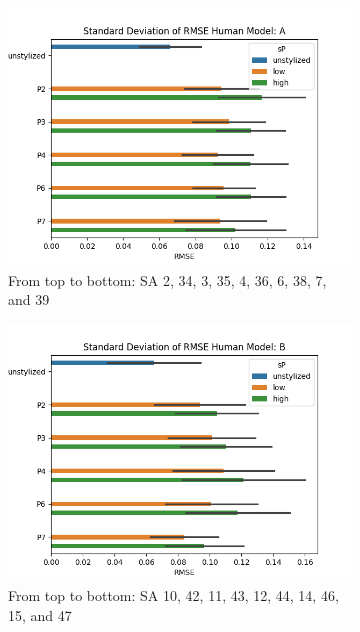\begin{figure}[ht]
	\centering
	\begin{subfigure}{0.49\textwidth}
		\includegraphics[width=\linewidth]{Figures/results/good/sd_rmse_dora.png}
		\caption{From top to bottom: SA 2, 34, 3, 35, 4, 36, 6, 38, 7, and 39}
	\end{subfigure}
	\begin{subfigure}{0.49\textwidth}
		\includegraphics[width=\linewidth]{Figures/results/good/sd_rmse_ephra.png}
		\caption{From top to bottom: SA 10, 42, 11, 43, 12, 44, 14, 46, 15, and 47}
	\end{subfigure}
	\begin{subfigure}{0.49\textwidth}

\end{subfigure}
\end{figure}

